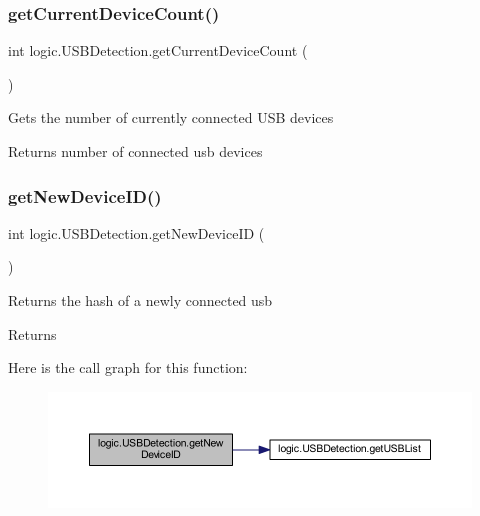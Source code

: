 \subsubsection{\texorpdfstring{get\+Current\+Device\+Count()}{getCurrentDeviceCount()}}
{\footnotesize\ttfamily int logic.\+U\+S\+B\+Detection.\+get\+Current\+Device\+Count (\begin{DoxyParamCaption}{ }\end{DoxyParamCaption})\hspace{0.3cm}{\ttfamily [private]}}

Gets the number of currently connected U\+SB devices \begin{DoxyReturn}{Returns}
number of connected usb devices 
\end{DoxyReturn}
\mbox{\label{classlogic_1_1_u_s_b_detection_a33eefbd24dcb95bf013fa91b0402c157}} 
\subsubsection{\texorpdfstring{get\+New\+Device\+I\+D()}{getNewDeviceID()}}
{\footnotesize\ttfamily int logic.\+U\+S\+B\+Detection.\+get\+New\+Device\+ID (\begin{DoxyParamCaption}{ }\end{DoxyParamCaption})\hspace{0.3cm}{\ttfamily [private]}}

Returns the hash of a newly connected usb \begin{DoxyReturn}{Returns}

\end{DoxyReturn}
Here is the call graph for this function\+:\nopagebreak
\begin{figure}[H]
\begin{center}
\leavevmode
\includegraphics[width=350pt]{classlogic_1_1_u_s_b_detection_a33eefbd24dcb95bf013fa91b0402c157_cgraph}
\end{center}
\end{figure}
\mbox{\label{classlogic_1_1_u_s_b_detection_aa344d4736cf7b1d95e5f3ff36d70de28}} 
